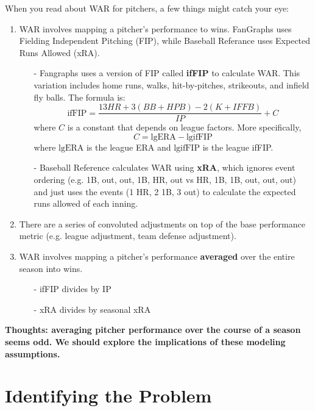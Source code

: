 \documentclass[twoside]{article}
\theoremstyle{definition}
\begin{document}
When you read about WAR for pitchers, a few things might catch your eye:
\begin{enumerate}
    \item WAR involves mapping a pitcher's performance to wins. FanGraphs uses Fielding Independent Pitching (FIP), while Baseball Referance uses Expected Runs Allowed (xRA).
    \begin{itemize}
        \item[-] Fangraphs uses a version of FIP called \textbf{ifFIP} to calculate WAR. This variation includes home runs, walks, hit-by-pitches, strikeouts, and infield fly balls. The formula is:
        \begin{equation}
            \text{ifFIP} = \frac{13HR + 3(BB+HPB) - 2(K + IFFB)}{IP} + C
        \end{equation}
        where $C$ is a constant that depends on league factors. More specifically,
        \begin{equation}
            C = \text{lgERA} - \text{lgifFIP}
        \end{equation}
        where $\text{lgERA}$ is the league ERA and $\text{lgifFIP}$ is the league ifFIP.
        \item[-] Baseball Reference calculates WAR using \textbf{xRA}, which ignores event ordering (e.g. 1B, out, out, 1B, HR, out vs HR, 1B, 1B, out, out, out) and just uses the events (1 HR, 2 1B, 3 out) to calculate the expected runs allowed of each inning.
    \end{itemize}
    \item There are a series of convoluted adjustments on top of the base performance metric (e.g. league adjustment, team defense adjustment).
    \item WAR involves mapping a pitcher's performance \textbf{averaged} over the entire season into wins.
    \begin{itemize}
        \item[-] ifFIP divides by IP
        \item[-] xRA divides by seasonal xRA
    \end{itemize}
\end{enumerate}

\color{red}
\textbf{Thoughts: averaging pitcher performance over the course of a season seems odd. We should explore the implications of these modeling assumptions.}
\color{black}

\section{Identifying the Problem}
\end{document}
